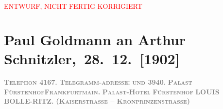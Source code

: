 
\begin{center}
            \textcolor{red}{ENTWURF, NICHT FERTIG KORRIGIERT}
                      \end{center}
            
         
         \renewcommand{\erwaehntePersonen}{Personen:  ?? [Partner von Theodore Rottenberg, Ende 1902/Anfang 1903], Louis Bolle-Ritz, Theodore Rottenberg, Olga Schnitzler}
         \renewcommand{\erwaehnteInstitutionen}{Institutionen: Hotel Fürstenhof}
         \renewcommand{\erwaehnteOrte}{Orte: Frankfurt am Main, Fürstenhof, Kaiserstraße, Münchener Straße, Wien}
         \renewcommand{\erwaehnteWerke}{Werke: Neue Freie Presse}
               \section[ Paul Goldmann an Arthur Schnitzler, 28. 12. {[}1902{]}]{ Paul Goldmann an Arthur Schnitzler, 28. 12. {[}1902{]}}\nopagebreak{}\rehead{ }\begin{ledgroupsized}[t]{13cm}\normalsize\beginnumbering \toendnotes[C]{\smallbreak\pagebreak[2]} 
\toendnotes[C]{\smallbreak}\pstart
           \noindent{}{\pb}\textcolor{gray}{\textbf{\textsc{Telephon}{ }4167.
                     }}\hfill \textcolor{gray}{\textbf{\textsc{Telegramm-adresse}:}}\pend
           \pstart
           \textcolor{gray}{\textbf{\textsc{und}{ }3940.
                     }}\hfill \textcolor{gray}{\textbf{\textsc{Palast FürstenhofFrankfurtmain.
                        }}}\pend
           \pstart
           \centering{}\textcolor{gray}{\textbf{\textsc{\textbf{Palast-Hotel}}}}\pend
           \pstart
           \noindent{}\centering{}\textcolor{gray}{\textbf{\textsc{Fürstenhof}}}\pend
           \pstart
           \noindent{}\centering{}\textcolor{gray}{\textbf{LOUIS BOLLE-RITZ.}}\pend
           \pstart
           \noindent{}\centering{}\textcolor{gray}{\textbf{(\textsc{Kaiserstrasse – Kronprinzenstrasse})}}\pend

\end{ledgroupsized}
